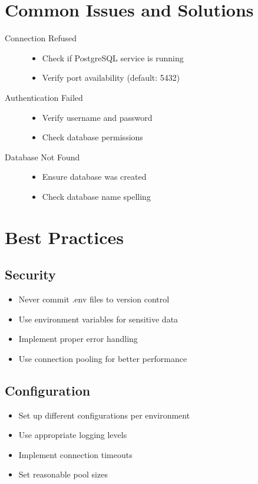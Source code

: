 \documentclass[12pt,a4paper]{book}
\begin{document}
	\section{Common Issues and Solutions}
	
	\begin{description}
		\item[Connection Refused] 
		\begin{itemize}
			\item Check if PostgreSQL service is running
			\item Verify port availability (default: 5432)
		\end{itemize}
		
		\item[Authentication Failed] 
		\begin{itemize}
			\item Verify username and password
			\item Check database permissions
		\end{itemize}
		
		\item[Database Not Found] 
		\begin{itemize}
			\item Ensure database was created
			\item Check database name spelling
		\end{itemize}
	\end{description}
	
	\section{Best Practices}
	
	\subsection{Security}
	\begin{itemize}
		\item Never commit .env files to version control
		\item Use environment variables for sensitive data
		\item Implement proper error handling
		\item Use connection pooling for better performance
	\end{itemize}
	
	\subsection{Configuration}
	\begin{itemize}
		\item Set up different configurations per environment
		\item Use appropriate logging levels
		\item Implement connection timeouts
		\item Set reasonable pool sizes
	\end{itemize}
	
\end{document}

